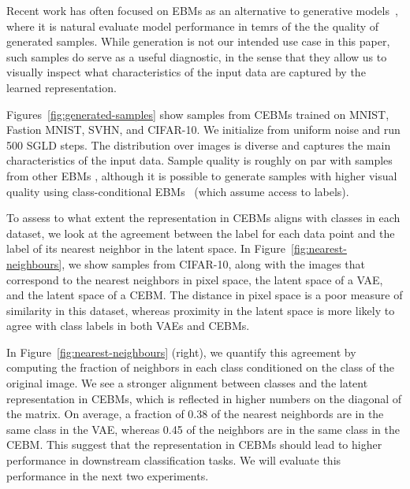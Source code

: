 \documentclass{article}
\begin{document}
Recent work has often focused on EBMs as an alternative to generative models~\cite{du2019implicit, nijkamp2019anatomy}, where it is natural evaluate model performance in temrs of the the quality of generated samples. While generation is not our intended use case in this paper, such samples do serve as a useful diagnostic, in the sense that they allow us to visually inspect what characteristics of the input data are captured by the learned representation. 

Figures~\ref{fig:generated-samples} show samples from CEBMs trained on MNIST, Fastion MNIST, SVHN, and CIFAR-10. We initialize from uniform noise and run 500 SGLD steps. The distribution over images is diverse and captures the main characteristics of the input data. Sample quality is roughly on par with samples from other EBMs \cite{nijkamp2019anatomy}, although it is possible to generate samples with higher visual quality using class-conditional EBMs~\cite{du2019implicit, grathwohl2019your, liu2020hybrid} (which assume access to labels).


To assess to what extent the representation in CEBMs aligns with classes in each dataset, we look at the agreement between the label for each data point and the label of its nearest neighbor in the latent space. In Figure~\ref{fig:nearest-neighbours}, we show samples from CIFAR-10, along with the images that correspond to the nearest neighbors in pixel space, the latent space of a VAE, and the latent space of a CEBM. The distance in pixel space is a poor measure of similarity in this dataset, whereas proximity in the latent space is more likely to agree with class labels in both VAEs and CEBMs. 

In Figure~\ref{fig:nearest-neighbours} (right), we quantify this agreement by computing the fraction of neighbors in each class conditioned on the class of the original image. We see a stronger alignment between classes and the latent representation in CEBMs, which is reflected in higher numbers on the diagonal of the matrix. On average, a fraction of 0.38 of the nearest neighbords are in the same class in the VAE, whereas 0.45 of the neighbors are in the same class in the CEBM. This suggest that the representation in CEBMs should lead to higher performance in downstream classification tasks. We will evaluate this performance in the next two experiments.
\end{document}
